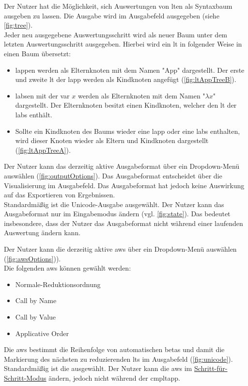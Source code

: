 \documentclass[parskip=full,11pt,twoside]{scrartcl}
\begin{document}
Der Nutzer hat die Möglichkeit, sich Auswertungen von \gls{lt}en als Syntaxbaum ausgeben zu lassen. Die Ausgabe wird im Ausgabefeld ausgegeben (siehe \cref{fig:tree}).\\
Jeder neu ausgegebene Auswertungsschritt wird als neuer Baum unter dem letzten Auswertungsschritt ausgegeben. Hierbei wird ein \gls{lt} in folgender Weise in einen Baum übersetzt:
\begin{itemize}
	\item \gls{lapp}en werden als Elternknoten mit dem Namen "App" dargestellt. 
	Der erste und zweite \gls{lt} der \gls{lapp} werden als Kindknoten angefügt (\cref{fig:ltAppTreeB}).
	\item \gls{labs}en mit der \gls{var} $x$ werden als Elternknoten mit dem Namen "$\lambda x$" dargestellt. 
	Der Elternknoten besitzt einen Kindknoten, welcher den \gls{lt} der \gls{labs} enthält.
	\item Sollte ein Kindknoten des Baums wieder eine \gls{lapp} oder eine \gls{labs} enthalten, wird dieser Knoten wieder als Eltern und Kindknoten dargestellt (\cref{fig:ltAppTreeA}).
\end{itemize}

Der Nutzer kann das derzeitig aktive Ausgabeformat über ein Dropdown-Menü auswählen (\cref{fig:outputOptions}).
Das Ausgabeformat entscheidet über die Visualisierung im Ausgabefeld. Das Ausgabeformat hat jedoch keine Auswirkung auf das Exportieren von Ergebnissen.\\
Standardmäßig ist die Unicode-Ausgabe ausgewählt.
Der Nutzer kann das Ausgabeformat nur im Eingabemodus ändern (vgl. \cref{fig:state}).
Das bedeutet insbesondere, dass der Nutzer das Ausgabeformat nicht während einer laufenden Auswertung ändern kann.

Der Nutzer kann die derzeitig aktive \gls{aws} über ein Dropdown-Menü auswählen (\cref{fig:awsOptions})).\\
Die folgenden \gls{aws} können gewählt werden:
\begin{itemize}
	\item Normale-Reduktionsordnung
	\item Call by Name
	\item Call by Value
	\item Applicative Order
\end{itemize}
Die \gls{aws} bestimmt die Reihenfolge von automatischen \glspl{beta} und damit die Markierung des nächsten zu reduzierenden \gls{lt}s im Ausgabefeld (\cref{fig:unicode}).\\
Standardmäßig ist die  ausgewählt. 
Der Nutzer kann die \gls{aws} im \hyperref[fnc:steps]{Schritt-für-Schritt-Modus} ändern, jedoch nicht während der \gls{cmpltapp}.
 
\end{document}
